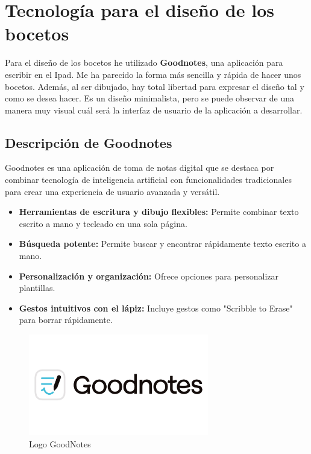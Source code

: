 \section{Tecnología para el diseño de los bocetos}

Para el diseño de los bocetos he utilizado \textbf{Goodnotes}, una aplicación para escribir en el Ipad. Me ha parecido la forma más sencilla y rápida de hacer unos bocetos. Además, al ser dibujado, hay total libertad para expresar el diseño tal y como se desea hacer. Es un diseño minimalista, pero se puede observar de una manera muy visual cuál será la interfaz de usuario de la aplicación a desarrollar. 

\subsection{Descripción de Goodnotes}

Goodnotes es una aplicación de toma de notas digital que se destaca por combinar tecnología de inteligencia artificial con funcionalidades tradicionales para crear una experiencia de usuario avanzada y versátil. \cite{goodnotes}

\begin{itemize}
	\item \textbf{Herramientas de escritura y dibujo flexibles:}  Permite combinar texto escrito a mano y tecleado en una sola página.
	\item \textbf{Búsqueda potente:} Permite buscar y encontrar rápidamente texto escrito a mano.
	\item \textbf{Personalización y organización: } Ofrece opciones para personalizar plantillas.
	\item \textbf{Gestos intuitivos con el lápiz: } Incluye gestos como "Scribble to Erase" para borrar rápidamente.
\end{itemize}

\begin{figure}[H]
	\centering
	\includegraphics[width=0.7\textwidth]{imagenes/imagenesTecnologias/goodnotes.jpg}
	\caption{Logo GoodNotes}
\end{figure}


